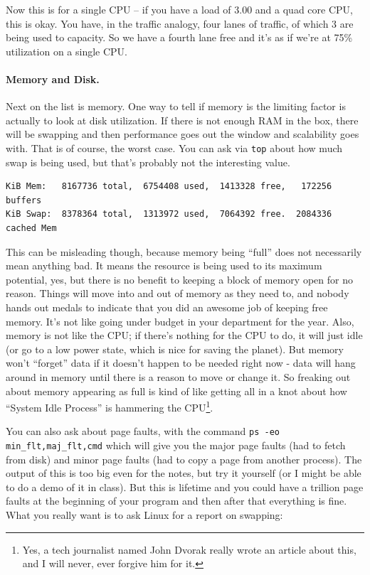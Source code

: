 \documentclass[a4paper]{report}
\begin{document}
Now this is for a single CPU -- if you have a load of 3.00 and a quad core CPU, this is okay. You have, in the traffic analogy, four lanes of traffic, of which 3 are being used to capacity. So we have a fourth lane free and it's as if we're at 75\% utilization on a single CPU.


\paragraph{Memory and Disk.} Next on the list is memory. One way to tell if memory is the limiting factor is actually to look at disk utilization. If there is not enough RAM in the box, there will be swapping and then performance goes out the window and scalability goes with. That is of course, the worst case. You can ask via \texttt{top} about how much swap is being used, but that's probably not the interesting value. 

\begin{verbatim}
KiB Mem:   8167736 total,  6754408 used,  1413328 free,   172256 buffers
KiB Swap:  8378364 total,  1313972 used,  7064392 free.  2084336 cached Mem
\end{verbatim}

This can be misleading though, because memory being ``full'' does not necessarily mean anything bad. It means the resource is being used to its maximum potential, yes, but there is no benefit to keeping a block of memory open for no reason. Things will move into and out of memory as they need to, and nobody hands out medals to indicate that you did an awesome job of keeping free memory. It's not like going under budget in your department for the year.  Also, memory is not like the CPU; if there's nothing for the CPU to do, it will just idle (or go to a low power state, which is nice for saving the planet). But memory won't ``forget'' data if it doesn't happen to be needed right now - data will hang around in memory until there is a reason to move or change it. So freaking out about memory appearing as full is kind of like getting all in a knot about how ``System Idle Process'' is hammering the CPU\footnote{Yes, a tech journalist named John Dvorak really wrote an article about this, and I will never, ever forgive him for it.}.

You can also ask about page faults, with the command \texttt{ps -eo min\_flt,maj\_flt,cmd} which will give you the major page faults (had to fetch from disk) and minor page faults (had to copy a page from another process). The output of this is too big even for the notes, but try it yourself (or I might be able to do a demo of it in class). But this is lifetime and you could have a trillion page faults at the beginning of your program and then after that everything is fine. What you really want is to ask Linux for a report on swapping:
\end{document}
